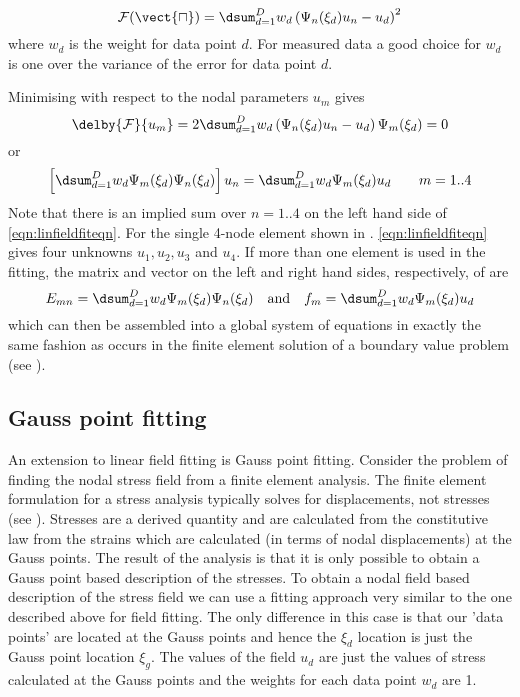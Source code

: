 \begin{equation}
  {\cal F(\vect{u})}=\dsum_{d=1}^{D}w_{d}\left(\Psi_n(\xi_{d})u_{n}-u_{d}\right)^{2}
  \label{eqn:datasumsqs}
\end{equation}
where $w_{d}$ is the weight for data point $d$. For measured data a good
choice for $w_{d}$ is one over the variance of the error for data point $d$.

Minimising  with respect to the nodal parameters $u_{m}$
gives
\begin{equation}
  \delby{{\cal F}}{u_{m}}=2\dsum_{d=1}^{D}w_{d}\left(\Psi_n(\xi_{d})u_{n}-
    u_{d}\right)\Psi_m(\xi_{d}) = 0
\end{equation}
or
\begin{equation}
  \left[\dsum_{d=1}^{D}w_{d}\Psi_m(\xi_{d})\Psi_n(\xi_{d})\right]u_{n}=
  \dsum_{d=1}^{D}w_{d}\Psi_m(\xi_{d})u_{d} \quad \quad m=1..4
  \label{eqn:linfieldfiteqn}
\end{equation}
Note that there is an implied sum over $n=1..4$ on the left hand side of
\eqref{eqn:linfieldfiteqn}. For the single 4-node element shown in
.    \eqref{eqn:linfieldfiteqn}
gives four unknowns $u_{1}, u_{2}, u_{3}$ and $u_{4}$. If more than one
element is used in the fitting, the matrix and vector on the left and right
hand sides, respectively, of  are
\begin{equation}
  E_{mn}=\dsum_{d=1}^{D}w_{d}\Psi_m(\xi_{d})\Psi_n(\xi_{d}) \quad \mbox{and} 
  \quad f_{m}=\dsum_{d=1}^{D}w_{d}\Psi_m(\xi_{d})u_{d}
\end{equation}
which can then be assembled into a global system of equations in exactly the
same fashion as occurs in the finite element solution of a boundary value
problem (see ).

\subsection{Gauss point fitting}

An extension to linear field fitting is Gauss point fitting. Consider the
problem of finding the nodal stress field from a finite element analysis. The
finite element formulation for a stress analysis typically solves for
displacements, not stresses (see ). Stresses are
a derived quantity and are calculated from the constitutive law from the
strains which are calculated (in terms of nodal displacements) at the Gauss
points. The result of the analysis is that it is only possible to obtain a
Gauss point based description of the stresses. To obtain a nodal field based
description of the stress field we can use a fitting approach very similar to
the one described above for field fitting. The only difference in this case is
that our 'data points' are located at the Gauss points and hence the $\xi_d$
location is just the Gauss point location $\xi_{g}$. The values of the field
$u_{d}$ are just the values of stress calculated at the Gauss points and the
weights for each data point $w_{d}$ are 1.

